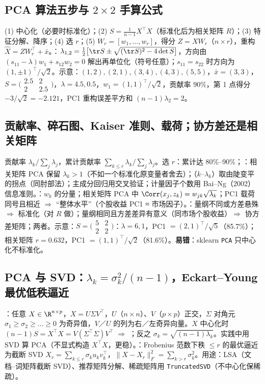 \subsection{PCA 算法五步与 \texorpdfstring{$2\times2$}{2x2} 手算公式}
(1) 中心化（必要时标准化）；(2) $S=\frac1{n-1}X^\top X$（标准化后为相关矩阵 $R$）；(3) 特征分解、降序；(4) 选 $r$；(5) $W_r=[w_1,\dots,w_r]$，得分 $Z=XW_r$（$n\times r$），重构 $\hat X=ZW_r^\top+\bar x$。：$\lambda_{1,2}=\frac12\big[\tr S\pm\sqrt{(\tr S)^2-4\det S}\big]$，方向由 $(s_{11}-\lambda)w_1+s_{12}w_2=0$ 解出再单位化（符号任意）；$s_{11}=s_{22}$ 时方向为 $(1,\pm1)^\top/\sqrt2$。示意：$(1,2),(2,1),(3,4),(4,3),(5,5)$，$\bar x=(3,3)$，$S=\bigl(\begin{smallmatrix}2.5&2\\2&2.5\end{smallmatrix}\bigr)$，$\lambda=4.5,0.5$，$w_1=(1,1)^\top/\sqrt2$，贡献率 90\%，第 1 点得分 $-3/\sqrt2=-2.121$，PC1 重构误差平方和 $(n-1)\lambda_2=2$。

\subsection{贡献率、碎石图、Kaiser 准则、载荷；协方差还是相关矩阵}
贡献率 $\lambda_k/\sum_j\lambda_j$，累计贡献率 $\sum_{k\le r}\lambda_k/\sum_j\lambda_j$。选 $r$：累计达 80\%–90\%；：相关矩阵 PCA 保留 $\lambda_k>1$（不如一个标准化原变量者舍去）；（$k$–$\lambda_k$）取由陡变平的拐点（同肘部法）；主成分回归用交叉验证；计量因子个数用 Bai–Ng（2002）信息准则。：$w_k$ 的分量；相关矩阵 PCA 中 $\Corr(x_j,z_k)=w_{jk}\sqrt{\lambda_k}$；PC1 载荷同号且相近 $\Rightarrow$ “整体水平”（个股收益 PC1 ≈ 市场因子）。：量纲不同或方差悬殊 $\Rightarrow$ 标准化（对 $R$ 做）；量纲相同且方差差异有意义（同市场个股收益）$\Rightarrow$ 协方差矩阵；两者。示意：$S=\bigl(\begin{smallmatrix}5&2\\2&2\end{smallmatrix}\bigr)$：$\lambda=6,1$，PC1 $=(2,1)^\top/\sqrt5$（85.7\%）；相关矩阵 $r=0.632$，PC1 $=(1,1)^\top/\sqrt2$（81.6\%）。\textbf{易错}：sklearn \texttt{PCA} 只中心化不标准化。

\subsection{PCA 与 SVD：\texorpdfstring{$\lambda_k=\sigma_k^2/(n-1)$}{lambda_k = sigma_k^2/(n-1)}，Eckart–Young 最优低秩逼近}
：任意 $X\in\R^{n\times p}$，$X=U\Sigma V^\top$，$U$（$n\times n$）、$V$（$p\times p$）正交，$\Sigma$ 对角元 $\sigma_1\ge\sigma_2\ge\dots\ge0$ 为奇异值，$V$／$U$ 的列为右／左奇异向量。$X$ 中心化时 $(n-1)S=X^\top X=V(\Sigma^\top\Sigma)V^\top$ $\Rightarrow$ ；反之 $\sigma_k=\sqrt{(n-1)\lambda_k}$。实践中用 SVD 算 PCA（不显式构造 $X^\top X$，更稳）。：Frobenius 范数下秩 $\le r$ 的最优逼近为截断 SVD $X_r=\sum_{k\le r}\sigma_ku_kv_k^\top$，$\|X-X_r\|_F^2=\sum_{k>r}\sigma_k^2$。用途：LSA（文档–词矩阵截断 SVD）、推荐矩阵分解、稀疏矩阵用 \texttt{TruncatedSVD}（不中心化保稀疏）。

